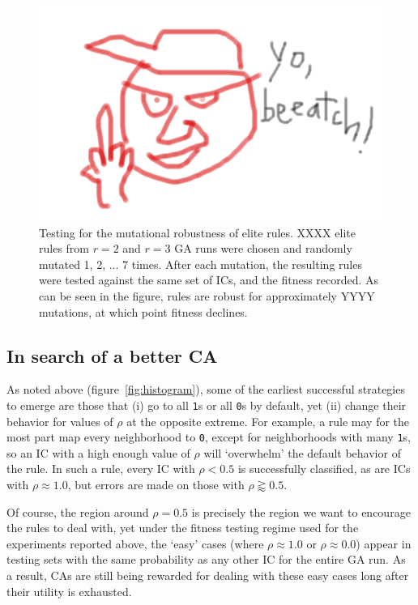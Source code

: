 \begin{figure}
\begin{center}
\includegraphics[width=\linewidth]{foo.png}
\caption{Testing for the mutational robustness of elite rules. XXXX elite rules from $r = 2$ and $r = 3$ GA runs were chosen and randomly mutated 1, 2, ... 7 
times. After each mutation, the resulting rules were tested against the same set of ICs, and the fitness recorded. As can be seen in the figure, 
rules are robust for approximately YYYY mutations, at which point fitness declines.}
\label{fig:robustness}
\end{center}
\end{figure}

\subsection{In search of a better CA} \label{sec:2_3}

As noted above (figure~\ref{fig:histogram}), some of the earliest successful strategies to emerge are those that (i) go to all \texttt{1}s or all \texttt{0}s by default, 
yet (ii) change their behavior for values of $\rho$ at the opposite extreme. For example, a rule may for the most part map every 
neighborhood to \texttt{0}, except for neighborhoods with many \texttt{1}s, so an IC with a high enough value of $\rho$ will 
`overwhelm' the default behavior of the rule. In such a rule, every IC with $\rho < 0.5$ is successfully classified, as are ICs with $\rho \approx 1.0$, but 
errors are made on those with $\rho \gtrapprox 0.5$.

Of course, the region around $\rho = 0.5$ is precisely the region we want to encourage the rules to deal with, yet under the fitness testing regime 
used for the experiments reported above, the `easy' cases (where $\rho \approx 1.0$ or $\rho \approx 0.0$) appear in testing sets  
with the same probability as any other IC for the entire GA run. As a result, CAs are still being rewarded for dealing with these easy cases long after their 
utility is exhausted.

